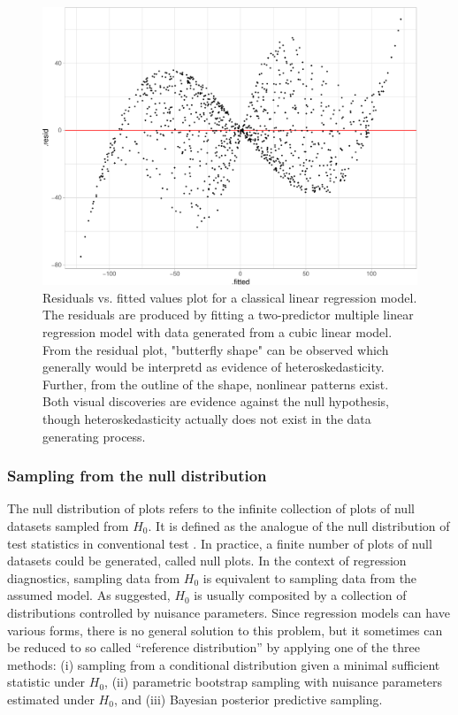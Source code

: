 \documentclass[]{interact}
\theoremstyle{plain}%
\theoremstyle{definition}
\theoremstyle{remark}
\begin{document}
\begin{figure}
\includegraphics[width=1\linewidth]{paper_comparison_files/figure-latex/residual-plot-cubic-heter-1} \caption{Residuals vs. fitted values plot for a classical linear regression model. The residuals are produced by fitting a two-predictor multiple linear regression model with data generated from a cubic linear model. From the residual plot, "butterfly shape" can be observed which generally would be interpretd as evidence of heteroskedasticity. Further, from the outline of the shape, nonlinear patterns exist. Both visual discoveries are evidence against the null hypothesis, though heteroskedasticity actually does not exist in the data generating process. \label{fig:residual-plot-cubic-heter}}\label{fig:residual-plot-cubic-heter}
\end{figure}

\hypertarget{se:sampling-from-null}{%
\subsubsection{Sampling from the null
distribution}\label{se:sampling-from-null}}

The null distribution of plots refers to the infinite collection of
plots of null datasets sampled from \(H_0\). It is defined as the
analogue of the null distribution of test statistics in conventional
test \citep{buja_statistical_2009}. In practice, a finite number of
plots of null datasets could be generated, called null plots. In the
context of regression diagnostics, sampling data from \(H_0\) is
equivalent to sampling data from the assumed model. As
\citet{buja_statistical_2009} suggested, \(H_0\) is usually composited
by a collection of distributions controlled by nuisance parameters.
Since regression models can have various forms, there is no general
solution to this problem, but it sometimes can be reduced to so called
``reference distribution'' by applying one of the three methods: (i)
sampling from a conditional distribution given a minimal sufficient
statistic under \(H_0\), (ii) parametric bootstrap sampling with
nuisance parameters estimated under \(H_0\), and (iii) Bayesian
posterior predictive sampling.
\end{document}
